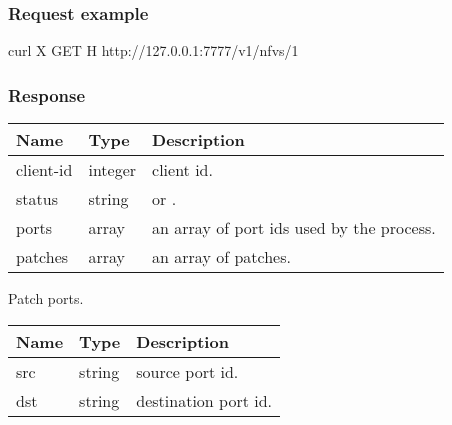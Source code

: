 \documentclass[a4paper,11pt,openany,oneside,english]{sphinxmanual}
\begin{document}
\subsubsection{Request example}
\label{\detokenize{api_ref/spp_nfv:request-example}}
\begin{sphinxVerbatim}[commandchars=\\\{\},formatcom=\footnotesize]
 curl \PYGZhy{}X GET \PYGZhy{}H  
  http://127.0.0.1:7777/v1/nfvs/1
\end{sphinxVerbatim}


\subsubsection{Response}
\label{\detokenize{api_ref/spp_nfv:response}}

\begin{savenotes}\sphinxattablestart
\centering
{}
\sphinxthecaptionisattop
{}\label{\detokenize{api_ref/spp_nfv:id24}}\label{\detokenize{api_ref/spp_nfv:table-spp-ctl-spp-nfv-res}}
\sphinxaftertopcaption
\begin{tabulary}{\linewidth}[t]{|T|T|T|}
\hline
\sphinxstyletheadfamily 
Name
&\sphinxstyletheadfamily 
Type
&\sphinxstyletheadfamily 
Description
\\
\hline
client-id
&
integer
&
client id.
\\
\hline
status
&
string
&
 or .
\\
\hline
ports
&
array
&
an array of port ids used by the process.
\\
\hline
patches
&
array
&
an array of patches.
\\
\hline
\end{tabulary}
\par
\sphinxattableend\end{savenotes}

Patch ports.


\begin{savenotes}\sphinxattablestart
\centering
{}
\sphinxthecaptionisattop
{}\label{\detokenize{api_ref/spp_nfv:id25}}\label{\detokenize{api_ref/spp_nfv:table-spp-ctl-patch-spp-nfv}}
\sphinxaftertopcaption
\begin{tabulary}{\linewidth}[t]{|T|T|T|}
\hline
\sphinxstyletheadfamily 
Name
&\sphinxstyletheadfamily 
Type
&\sphinxstyletheadfamily 
Description
\\
\hline
src
&
string
&
source port id.
\\
\hline
dst
&
string
&
destination port id.
\\
\hline
\end{tabulary}
\par
\sphinxattableend\end{savenotes}
\end{document}
